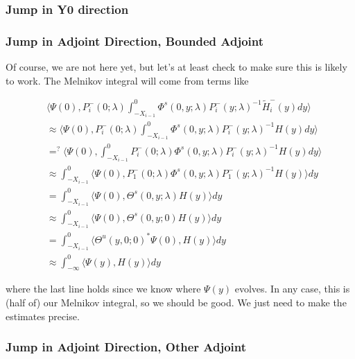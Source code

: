 \documentclass[12pt]{article}
\begin{document}
\subsubsection*{Jump in Y0 direction}


\subsubsection*{Jump in Adjoint Direction, Bounded Adjoint}

Of course, we are not here yet, but let's at least check to make sure this is likely to work. The Melnikov integral will come from terms like

\begin{align*}
&\langle \Psi(0), P_i^-(0; \lambda) \int_{-X_{i-1}}^0 \Phi^s(0, y; \lambda) P_i^-(y; \lambda)^{-1} \tilde{H}_i^-(y) dy \rangle \\
&\approx \langle \Psi(0), P_i^-(0; \lambda) \int_{-X_{i-1}}^0 \Phi^s(0, y; \lambda) P_i^-(y; \lambda)^{-1} H(y) dy \rangle \\
&=^? \langle \Psi(0), \int_{-X_{i-1}}^0 P_i^-(0; \lambda) \Phi^s(0, y; \lambda) P_i^-(y; \lambda)^{-1} H(y) dy \rangle \\
&\approx \int_{-X_{i-1}}^0 \langle \Psi(0), P_1^-(0; \lambda) \Phi^s(0, y; \lambda) P_1^-(y; \lambda)^{-1} H(y) \rangle dy \\
&= \int_{-X_{i-1}}^0 \langle \Psi(0), \Theta^s(0, y; \lambda) H(y) \rangle dy \\
&\approx \int_{-X_{i-1}}^0 \langle \Psi(0), \Theta^s(0, y; 0) H(y) \rangle dy\\
&= \int_{-X_{i-1}}^0 \langle \Theta^u(y, 0; 0)^* \Psi(0), H(y) \rangle dy \\
&\approx \int_{-\infty}^0 \langle \Psi(y), H(y) \rangle dy
\end{align*}

where the last line holds since we know where $\Psi(y)$ evolves. In any case, this is (half of) our Melnikov integral, so we should be good. We just need to make the estimates precise.

\subsubsection*{Jump in Adjoint Direction, Other Adjoint}
\end{document}
